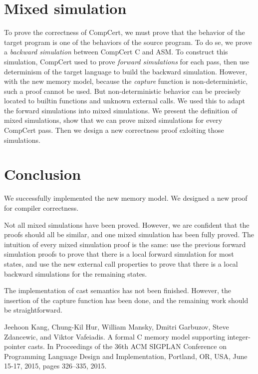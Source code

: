 \documentclass[nocopyrightspace]{sigplanconf}
\begin{document}
\section{Mixed simulation}
To prove the correctness of CompCert, we must prove that the behavior of the target program is one of the behaviors of the source program. To do se, we prove a \textit{backward simulation} between CompCert C and ASM. To construct this simulation, CompCert used to prove \textit{forward simulations} for each pass, then use determinism of the target language to build the backward simulation.
However, with the new memory model, because the \textit{capture} function is non-deterministic, such a proof cannot be used. But non-deterministic behavior can be precisely located to builtin functions and unknown external calls. We used this to adapt the forward simulations into mixed simulations. We present the definition of mixed simulations, show that we can prove mixed simulations for every CompCert pass. Then we design a new correctness proof exloiting those simulations.

\section{Conclusion}
We successfully implemented the new memory model.
We designed a new proof for compiler correctness.

Not all mixed simulations have been proved. However, we are confident that the proofs should all be similar, and one mixed simulation has been fully proved. The intuition of every mixed simulation proof is the same: use the previous forward simulation proofs to prove that there is a local forward simulation for most states, and use the new external call properties to prove that there is a local backward simulations for the remaining states.

The implementation of cast semantics has not been finished. However, the insertion of the capture function has been done, and the remaining work should be straightforward.








\begin{thebibliography}{00}
 Jeehoon Kang, Chung-Kil Hur, William Mansky, Dmitri Garbuzov, Steve Zdancewic, and Viktor Vafeiadis. A formal C memory model supporting integer-pointer casts. In Proceedings of the 36th ACM SIGPLAN Conference on Programming Language Design and Implementation, Portland, OR, USA, June 15-17, 2015, pages 326–335, 2015.
\end{thebibliography}
\end{document}
